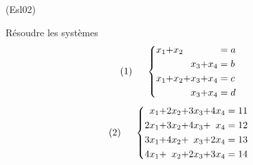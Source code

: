 \begin{tiny}(Esl02)\end{tiny} Résoudre les systèmes
\begin{displaymath}
 (1)\hspace{0.5cm}\left\lbrace 
\begin{alignedat}{5}
 x_1 & + & x_2 &   &     &   &      & = a\\
     &   &     &   & x_3 & + & x_4  & = b\\
 x_1 & + & x_2 & + & x_3 & + & x_4  & = c \\
     &   &     &   & x_3 & + & x_4  & = d
\end{alignedat}
\right. 
\end{displaymath}
\begin{displaymath}
 (2)\hspace{0.5cm}\left\lbrace 
\begin{alignedat}{5}
 x_1  & + & 2x_2 & + & 3x_3 & + & 4x_4 & = 11\\
 2x_1 & + & 3x_2 & + & 4x_3 & + &  x_4 & = 12\\
 3x_1 & + & 4x_2 & + & x_3 & + & 2x_4 & = 13\\
 4x_1 & + &  x_2 & + & 2x_3 & + & 3x_4 & = 14
\end{alignedat}
\right. 
\end{displaymath}
